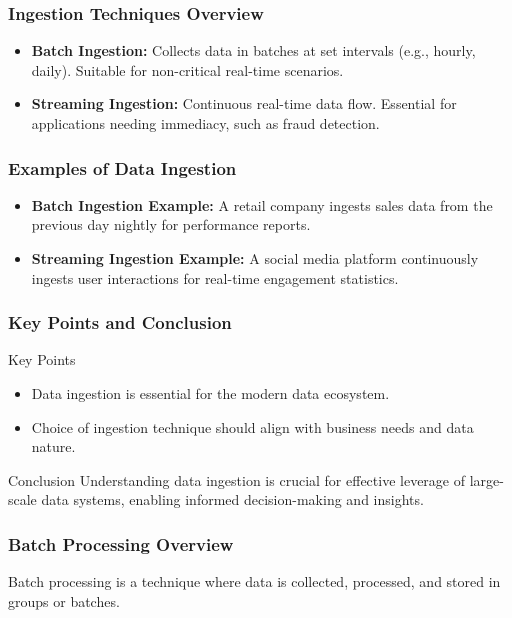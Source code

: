 \documentclass[aspectratio=169]{beamer}
\begin{document}
\begin{frame}[fragile]
    \frametitle{Ingestion Techniques Overview}
    \begin{itemize}
        \item \textbf{Batch Ingestion:} Collects data in batches at set intervals (e.g., hourly, daily). Suitable for non-critical real-time scenarios.
        \item \textbf{Streaming Ingestion:} Continuous real-time data flow. Essential for applications needing immediacy, such as fraud detection.
    \end{itemize}
\end{frame}

\begin{frame}[fragile]
    \frametitle{Examples of Data Ingestion}
    \begin{itemize}
        \item \textbf{Batch Ingestion Example:} A retail company ingests sales data from the previous day nightly for performance reports.
        \item \textbf{Streaming Ingestion Example:} A social media platform continuously ingests user interactions for real-time engagement statistics.
    \end{itemize}
\end{frame}

\begin{frame}[fragile]
    \frametitle{Key Points and Conclusion}
    \begin{block}{Key Points}
        \begin{itemize}
            \item Data ingestion is essential for the modern data ecosystem.
            \item Choice of ingestion technique should align with business needs and data nature.
        \end{itemize}
    \end{block}
    \begin{block}{Conclusion}
        Understanding data ingestion is crucial for effective leverage of large-scale data systems, enabling informed decision-making and insights.
    \end{block}
\end{frame}

\begin{frame}[fragile]
    \frametitle{Batch Processing Overview}
    Batch processing is a technique where data is collected, processed, and stored in groups or batches.
\end{frame}
\end{document}
